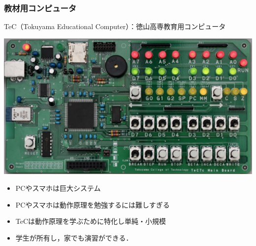 \documentclass[handout]{beamer}        %
\begin{document}
\begin{frame}
  \frametitle{教材用コンピュータ}
  TeC（Tokuyama Educational Computer）：徳山高専教育用コンピュータ

  \centerline{\includegraphics[scale=0.2]{../Img/TeC7c.jpg}}
  \begin{itemize}
  \item PCやスマホは巨大システム
  \item PCやスマホは動作原理を勉強するには難しすぎる
  \item TeCは動作原理を学ぶために特化し単純・小規模
  \item 学生が所有し，家でも演習ができる．
  \end{itemize}
  \vfill
\end{frame}
\end{document}
